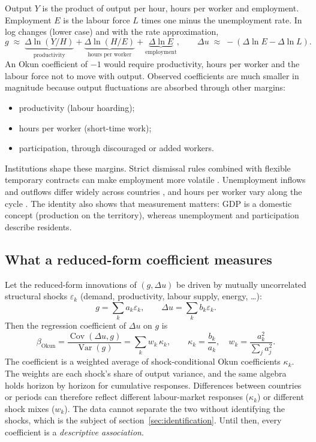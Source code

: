 Output $Y$ is the product of output per hour, hours per worker and employment. Employment
$E$ is the labour force $L$ times one minus the unemployment rate. In log changes (lower
case) and with the rate approximation,
\begin{equation}\label{eq:identity}
  g \;\approx\; \underbrace{\Delta\ln(Y/H)}_{\text{productivity}}
  + \underbrace{\Delta\ln(H/E)}_{\text{hours per worker}}
  + \underbrace{\Delta\ln E}_{\text{employment}},
  \qquad
  \Delta u \;\approx\; -(\Delta\ln E - \Delta\ln L).
\end{equation}
An Okun coefficient of $-1$ would require productivity, hours per worker and the labour
force not to move with output. Observed coefficients are much smaller in magnitude because
output fluctuations are absorbed through other margins:
\begin{itemize}
  \item productivity (labour hoarding);
  \item hours per worker (short-time work);
  \item participation, through discouraged or added workers.
\end{itemize}
Institutions shape these margins. Strict dismissal rules combined with flexible temporary
contracts can make employment more volatile \citep{bentolila2012twotier}. Unemployment
inflows and outflows differ widely across countries \citep{blanchard2001portugal}, and
hours per worker vary along the cycle \citep{ohanian2012hours}. The identity also shows
that measurement matters: GDP is a domestic concept (production on the territory), whereas
unemployment and participation describe residents.

\subsection{What a reduced-form coefficient measures}\label{sec:weighted}

Let the reduced-form innovations of $(g,\Delta u)$ be driven by mutually uncorrelated
structural shocks $\varepsilon_k$ (demand, productivity, labour supply, energy, \dots):
\[
  g=\sum_k a_k\varepsilon_k, \qquad \Delta u=\sum_k b_k\varepsilon_k .
\]
Then the regression coefficient of $\Delta u$ on $g$ is
\begin{equation}\label{eq:weighted}
  \beta_{\mathrm{Okun}}=\frac{\operatorname{Cov}(\Delta u,g)}{\operatorname{Var}(g)}
  =\sum_k w_k\,\kappa_k,\qquad
  \kappa_k=\frac{b_k}{a_k},\quad w_k=\frac{a_k^2}{\sum_j a_j^2}.
\end{equation}
The coefficient is a weighted average of shock-conditional Okun coefficients
$\kappa_k$. The weights are each shock's share of output variance, and the same algebra holds
horizon by horizon for cumulative responses. Differences between countries or periods can
therefore reflect different labour-market responses ($\kappa_k$) or different shock
mixes ($w_k$). The data cannot separate the two without identifying the shocks, which is
the subject of section~\ref{sec:identification}. Until then, every coefficient is a
\emph{descriptive association}.
